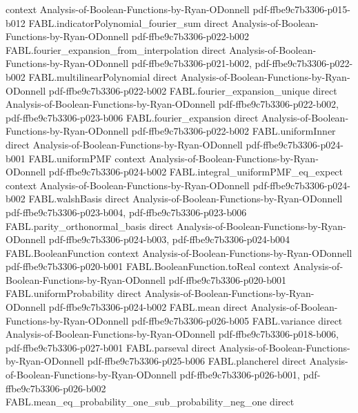 \begin{theorem}
  {context}
  {Analysis-of-Boolean-Functions-by-Ryan-ODonnell}
  {pdf-ffbe9c7b3306-p015-b012}
\proofstep
  {FABL.indicatorPolynomial_fourier_sum}
  {direct}
  {Analysis-of-Boolean-Functions-by-Ryan-ODonnell}
  {pdf-ffbe9c7b3306-p022-b002}
\proofstep
  {FABL.fourier_expansion_from_interpolation}
  {direct}
  {Analysis-of-Boolean-Functions-by-Ryan-ODonnell}
  {pdf-ffbe9c7b3306-p021-b002,
    pdf-ffbe9c7b3306-p022-b002}
\proofstep
  {FABL.multilinearPolynomial}
  {direct}
  {Analysis-of-Boolean-Functions-by-Ryan-ODonnell}
  {pdf-ffbe9c7b3306-p022-b002}
\proofstep
  {FABL.fourier_expansion_unique}
  {direct}
  {Analysis-of-Boolean-Functions-by-Ryan-ODonnell}
  {pdf-ffbe9c7b3306-p022-b002,
    pdf-ffbe9c7b3306-p023-b006}
\proofstep
  {FABL.fourier_expansion}
  {direct}
  {Analysis-of-Boolean-Functions-by-Ryan-ODonnell}
  {pdf-ffbe9c7b3306-p022-b002}
\proofstep
  {FABL.uniformInner}
  {direct}
  {Analysis-of-Boolean-Functions-by-Ryan-ODonnell}
  {pdf-ffbe9c7b3306-p024-b001}
\proofstep
  {FABL.uniformPMF}
  {context}
  {Analysis-of-Boolean-Functions-by-Ryan-ODonnell}
  {pdf-ffbe9c7b3306-p024-b002}
\proofstep
  {FABL.integral_uniformPMF_eq_expect}
  {context}
  {Analysis-of-Boolean-Functions-by-Ryan-ODonnell}
  {pdf-ffbe9c7b3306-p024-b002}
\proofstep
  {FABL.walshBasis}
  {direct}
  {Analysis-of-Boolean-Functions-by-Ryan-ODonnell}
  {pdf-ffbe9c7b3306-p023-b004,
    pdf-ffbe9c7b3306-p023-b006}
\proofstep
  {FABL.parity_orthonormal_basis}
  {direct}
  {Analysis-of-Boolean-Functions-by-Ryan-ODonnell}
  {pdf-ffbe9c7b3306-p024-b003,
    pdf-ffbe9c7b3306-p024-b004}
\proofstep
  {FABL.BooleanFunction}
  {context}
  {Analysis-of-Boolean-Functions-by-Ryan-ODonnell}
  {pdf-ffbe9c7b3306-p020-b001}
\proofstep
  {FABL.BooleanFunction.toReal}
  {context}
  {Analysis-of-Boolean-Functions-by-Ryan-ODonnell}
  {pdf-ffbe9c7b3306-p020-b001}
\proofstep
  {FABL.uniformProbability}
  {direct}
  {Analysis-of-Boolean-Functions-by-Ryan-ODonnell}
  {pdf-ffbe9c7b3306-p024-b002}
\proofstep
  {FABL.mean}
  {direct}
  {Analysis-of-Boolean-Functions-by-Ryan-ODonnell}
  {pdf-ffbe9c7b3306-p026-b005}
\proofstep
  {FABL.variance}
  {direct}
  {Analysis-of-Boolean-Functions-by-Ryan-ODonnell}
  {pdf-ffbe9c7b3306-p018-b006,
    pdf-ffbe9c7b3306-p027-b001}
\proofstep
  {FABL.parseval}
  {direct}
  {Analysis-of-Boolean-Functions-by-Ryan-ODonnell}
  {pdf-ffbe9c7b3306-p025-b006}
\proofstep
  {FABL.plancherel}
  {direct}
  {Analysis-of-Boolean-Functions-by-Ryan-ODonnell}
  {pdf-ffbe9c7b3306-p026-b001,
    pdf-ffbe9c7b3306-p026-b002}
\proofstep
  {FABL.mean_eq_probability_one_sub_probability_neg_one}
  {direct}

\end{theorem}
